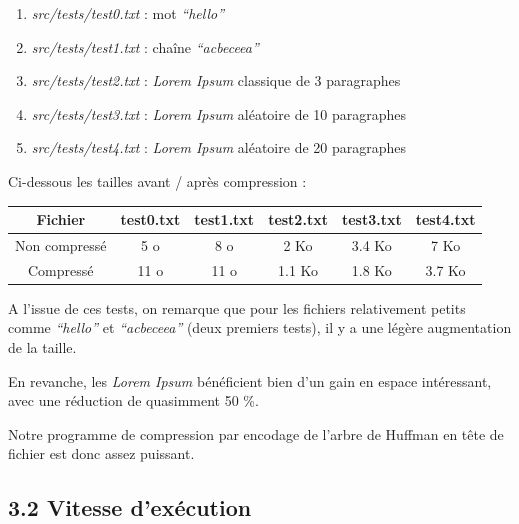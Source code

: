 \documentclass [a4paper,11pt] {report}
\begin{document}
\begin{enumerate}

\item%
\textit{src/tests/test0.txt} : mot \textit{``hello''}

\item%
\textit{src/tests/test1.txt} : chaîne \textit{``acbeceea''}

\item%
\textit{src/tests/test2.txt} : \textit{Lorem Ipsum} classique de 3 paragraphes

\item%
\textit{src/tests/test3.txt} : \textit{Lorem Ipsum} aléatoire de 10 paragraphes

\item%
\textit{src/tests/test4.txt} : \textit{Lorem Ipsum} aléatoire de 20 paragraphes

\end{enumerate}
\vspace{0.5cm}

Ci-dessous les tailles avant / après compression :
\begin{center}
\begin{tabular}{|c|c|c|c|c|c|}
 \hline
Fichier & test0.txt & test1.txt & test2.txt & test3.txt & test4.txt\\
 \hline
Non compressé & 5 o & 8 o & 2 Ko & 3.4 Ko & 7 Ko\\
Compressé & 11 o & 11 o & 1.1 Ko & 1.8 Ko & 3.7 Ko\\
 \hline
\end{tabular}
\end{center}

\newpage

A l'issue de ces tests, on remarque que pour les fichiers relativement petits comme \textit{``hello''} et \textit{``acbeceea''} (deux premiers tests), il y a une légère augmentation de la taille.

En revanche, les \textit{Lorem Ipsum} bénéficient bien d'un gain en espace intéressant, avec une réduction de quasimment 50 \%.

Notre programme de compression par encodage de l'arbre de Huffman en tête de fichier est donc assez puissant.


\subsection* {3.2\hspace{3mm} Vitesse d'exécution}
\end{document}

